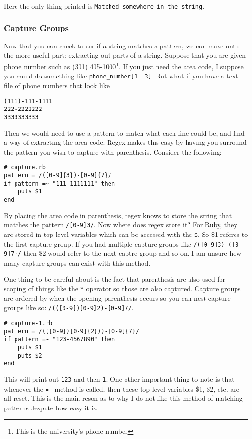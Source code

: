 \documentclass[main.tex]{subfiles}
\begin{document}
Here the only thing printed is \texttt{Matched somewhere in the string}.
\subsubsection{Capture Groups}\label{grouping_section}

Now that you can check to see if a string matches a pattern, we can move onto the more useful part: extracting out parts of a string. Suppose that you are given phone number such as (301) 405-1000\footnote{This is the university's phone number}. If you just need the area code, I suppose you could do something like \texttt{phone\_number[1..3]}. 
But what if you have a text file of phone numbers that look like
\begin{lstlisting}[style=MyRubyStyle]
(111)-111-1111
222-2222222
3333333333
\end{lstlisting}

Then we would need to use a pattern to match what each line could be, and find a way of extracting the area code. 
Regex makes this easy by having you surround the pattern you wish to capture with parenthesis. Consider the following:
\begin{lstlisting}[style=MyRubyStyle]
# capture.rb
pattern = /([0-9]{3})-[0-9]{7}/
if pattern =~ "111-1111111" then 
    puts $1
end
\end{lstlisting}

By placing the area code in parenthesis, regex knows to store the string that matches the pattern \texttt{/[0-9]{3}/}. Now where does regex store it? For Ruby, they are stored in top level variables which can be accessed with the \texttt{\$}. So \$1 referes to the first capture group. If you had multiple capture groups like \texttt{/([0-9]{3})-([0-9]{7})/} then \$2 would refer to the next captre group and so on. I am unsure how many capture groups can exist with this method.

One thing to be careful about is the fact that parenthesis are also used for scoping of things like the \texttt{*} operator so those are also captured. Capture groups are ordered by when the opening parenthesis occurs so you can nest capture groups like so: \texttt{/(([0-9])[0-9]{2})-[0-9]{7}/}. 
\begin{lstlisting}[style=MyRubyStyle]
# capture-1.rb
pattern = /(([0-9])[0-9]{2}))-[0-9]{7}/
if pattern =~ "123-4567890" then 
    puts $1
    puts $2
end
\end{lstlisting}
This will print out \texttt{123} and then \texttt{1}. 
One other important thing to note is that whenever the \texttt{=~} method is called, then these top level variables \$1, \$2, etc, are all reset. This is the main reson as to why I do not like this method of matching patterns despute how easy it is. 
\end{document}
